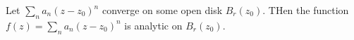 
\begin{proposition}\label{1.1.14}
	Let $\sum_{n} a_n(z-z_0)^n$ converge on some open disk $B_r(z_0)$. THen the function $f(z)=\sum_{n} a_n(z-z_0)^n$ is analytic on $B_r(z_0)$.
\end{proposition}
